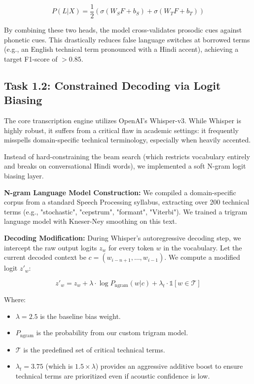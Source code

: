 \documentclass[conference]{IEEEtran}
\begin{document}
\begin{equation}
P(L|X) = \frac{1}{2} \left( \sigma(W_S F + b_S) + \sigma(W_T F + b_T) \right)
\end{equation}

By combining these two heads, the model cross-validates prosodic cues against phonetic cues. This drastically reduces false language switches at borrowed terms (e.g., an English technical term pronounced with a Hindi accent), achieving a target F1-score of $>0.85$.

\subsection{Task 1.2: Constrained Decoding via Logit Biasing}

The core transcription engine utilizes OpenAI's Whisper-v3. While Whisper is highly robust, it suffers from a critical flaw in academic settings: it frequently misspells domain-specific technical terminology, especially when heavily accented.

Instead of hard-constraining the beam search (which restricts vocabulary entirely and breaks on conversational Hindi words), we implemented a soft N-gram logit biasing layer. 

\textbf{N-gram Language Model Construction:} We compiled a domain-specific corpus from a standard Speech Processing syllabus, extracting over 200 technical terms (e.g., "stochastic", "cepstrum", "formant", "Viterbi"). We trained a trigram language model with Kneser-Ney smoothing on this text.

\textbf{Decoding Modification:} During Whisper's autoregressive decoding step, we intercept the raw output logits $z_w$ for every token $w$ in the vocabulary. Let the current decoded context be $c = (w_{i-n+1}, \ldots, w_{i-1})$. We compute a modified logit $z'_w$:

\begin{equation}
z'_w = z_w + \lambda \cdot \log P_{\text{ngram}}(w | c) + \lambda_t \cdot \mathbb{1}[w \in \mathcal{T}]
\end{equation}

Where:
\begin{itemize}
    \item $\lambda = 2.5$ is the baseline bias weight.
    \item $P_{\text{ngram}}$ is the probability from our custom trigram model.
    \item $\mathcal{T}$ is the predefined set of critical technical terms.
    \item $\lambda_t = 3.75$ (which is $1.5 \times \lambda$) provides an aggressive additive boost to ensure technical terms are prioritized even if acoustic confidence is low.
\end{itemize}
\end{document}
